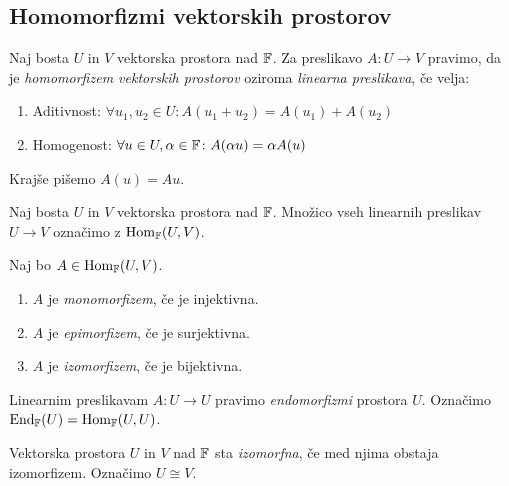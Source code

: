 \documentclass[12pt, a4paper]{article}
\begin{document}
\obvs

\newpage

\subsection{Homomorfizmi vektorskih prostorov}

\begin{okvir}
\begin{definicija}
Naj bosta $U$ in $V$ vektorska prostora nad $\mathbb{F}$. Za preslikavo $A\colon U\to V$ pravimo, da je \emph{homomorfizem vektorskih prostorov} oziroma \emph{linearna preslikava}, če velja:

\begin{enumerate}[label=\arabic*)]
\item Aditivnost: $\forall u_1,u_2\in U\colon A(u_1+u_2)=A(u_1)+A(u_2)$ 
\item Homogenost: $\forall u\in U,\alpha\in\mathbb{F}\colon A(\alpha u)=\alpha A(u)$ 
\end{enumerate}

Krajše pišemo $A(u)=Au$.
\end{definicija}
\end{okvir}

\begin{definicija}
Naj bosta $U$ in $V$ vektorska prostora nad $\mathbb{F}$. Množico vseh linearnih preslikav $U\to V$ označimo z $\operatorname{Hom}_{\mathbb{F}}(U,V)$.
\end{definicija}

\begin{definicija}
Naj bo $A\in\operatorname{Hom}_{\mathbb{F}}(U,V)$.

\begin{enumerate}[label=\alph*)]
\item $A$ je \emph{monomorfizem}, če je injektivna.
\item $A$ je \emph{epimorfizem}, če je surjektivna.
\item $A$ je \emph{izomorfizem}, če je bijektivna.
\end{enumerate}
\end{definicija}

\begin{definicija}
Linearnim preslikavam $A\colon U\to U$ pravimo \emph{endomorfizmi} prostora $U$. Označimo $\operatorname{End}_{\mathbb{F}}(U)=\operatorname{Hom}_{\mathbb{F}}(U,U)$.
\end{definicija}

\begin{definicija}
Vektorska prostora $U$ in $V$ nad $\mathbb{F}$ sta \emph{izomorfna}, če med njima obstaja izomorfizem. Označimo $U\cong V$.
\end{definicija}
\end{document}
